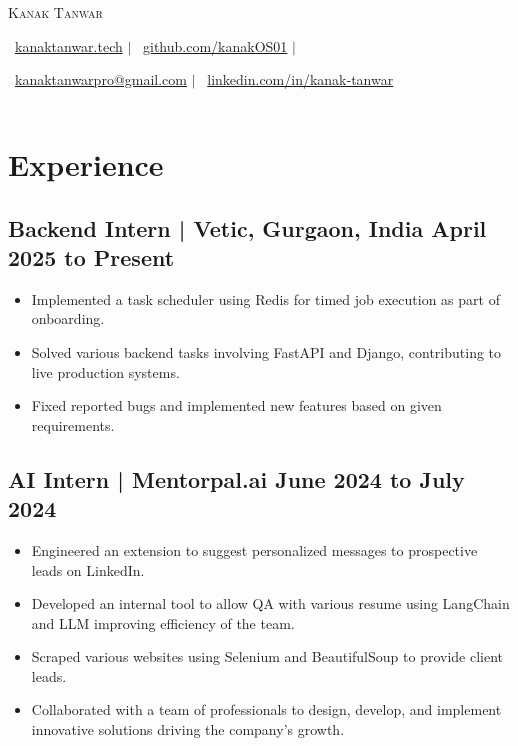 \documentclass[a4paper,11pt]{article}
\begin{document}
\pagestyle{empty} %

\vspace{-10mm}
\begin{center}
    {\Huge\scshape Kanak Tanwar}
    
    \vspace{0.01em}
    \faGlobe\ \href{https://kanaktanwar.tech}{kanaktanwar.tech} $\vert$
    \faGithub\ \href{https://github.com/kanakOS01}{github.com/kanakOS01} $\vert$
    
    \faEnvelope\ \href{mailto:kanaktanwarpro@gmail.com}{kanaktanwarpro@gmail.com} $\vert$
    \faLinkedin\ \href{https://www.linkedin.com/in/kanak-tanwar/}{linkedin.com/in/kanak-tanwar}
\end{center} 
\vspace{-7mm}

    \small\begin{tabularx}{\textwidth}{|c|Y|c|c|}
    \end{tabularx}

\section*{Experience}
\vspace{-2mm}

\subsection{Backend Intern | Vetic, Gurgaon, India
\hfill April 2025 to Present}
\begin{itemize}[itemsep=0pt,parsep=0pt,topsep=0pt,partopsep=0pt]
    \item Implemented a task scheduler using Redis for timed job execution as part of onboarding.
    \item Solved various backend tasks involving FastAPI and Django, contributing to live production systems.
    \item Fixed reported bugs and implemented new features based on given requirements.
\end{itemize}
\vspace{-3mm}


\subsection{AI Intern | Mentorpal.ai 
\hfill June 2024 to July 2024}
\begin{itemize}[itemsep=0pt,parsep=0pt,topsep=0pt,partopsep=0pt]
    \item Engineered an extension to suggest personalized messages to prospective leads on LinkedIn.
    \item Developed an internal tool to allow QA with various resume using LangChain and LLM improving efficiency of the team.
    \item Scraped various websites using Selenium and BeautifulSoup to provide client leads.
    \item Collaborated with a team of professionals to design, develop, and implement innovative solutions driving the company’s growth.
\end{itemize}
\vspace{-5mm}
\end{document}
